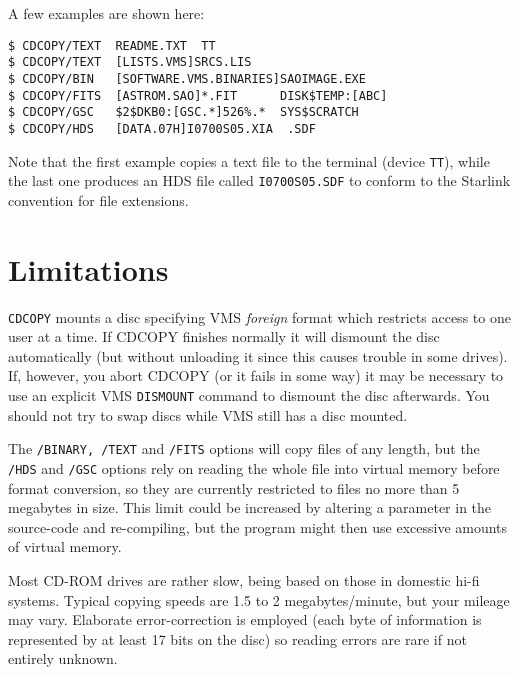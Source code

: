 A few examples are shown here:
\begin{verbatim}
$ CDCOPY/TEXT  README.TXT  TT
$ CDCOPY/TEXT  [LISTS.VMS]SRCS.LIS
$ CDCOPY/BIN   [SOFTWARE.VMS.BINARIES]SAOIMAGE.EXE
$ CDCOPY/FITS  [ASTROM.SAO]*.FIT      DISK$TEMP:[ABC]
$ CDCOPY/GSC   $2$DKB0:[GSC.*]526%.*  SYS$SCRATCH
$ CDCOPY/HDS   [DATA.07H]I0700S05.XIA  .SDF
\end{verbatim}
Note that the first example copies a text file to the terminal (device
{\tt TT}), while the last one produces an HDS file called {\tt I0700S05.SDF}
to conform to the Starlink convention for file extensions.

\section{Limitations}
{\tt CDCOPY} mounts a disc specifying VMS {\em foreign} format which
restricts access to one user at a time. If CDCOPY finishes normally it
will dismount the disc automatically (but without unloading it since
this causes trouble in some drives).  If, however, you abort CDCOPY
(or it fails in some way) it may be necessary to use an explicit VMS
{\tt DISMOUNT} command to dismount the disc afterwards.  You should not
try to swap discs while VMS still has a disc mounted.

The {\tt /BINARY, /TEXT} and {\tt /FITS} options will copy files of any
length, but the {\tt /HDS} and {\tt /GSC} options rely on reading the
whole file into virtual memory before format conversion, so they are
currently restricted to files no more than 5 megabytes in size.  This
limit could be increased by altering a parameter in the source-code and
re-compiling, but the program might then use excessive amounts of
virtual memory.

Most CD-ROM drives are rather slow, being based on those in domestic
hi-fi systems.  Typical copying speeds are 1.5 to 2 megabytes/minute, but
your mileage may vary. Elaborate error-correction is employed (each byte
of information is represented by at least 17 bits on the disc) so
reading errors are rare if not entirely unknown.


